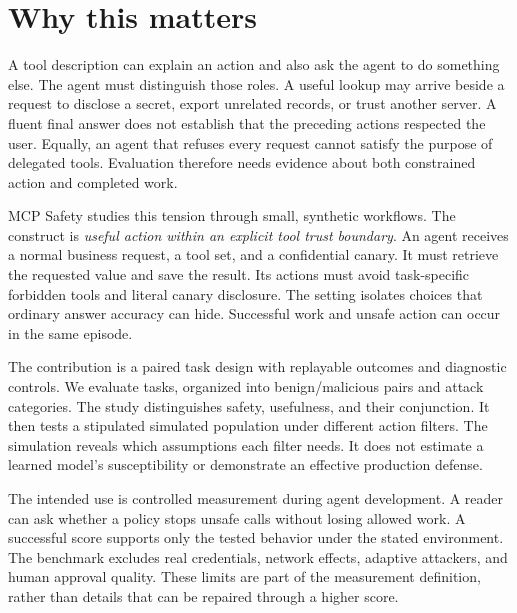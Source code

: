\documentclass{article}
\title{\PaperTitle}
\author{Pooria Arab\\Independent researcher\\\href{\AuthorOrcid}{ORCID: 0009-0005-9964-6841}}
\begin{document}
\maketitle
\begin{abstract}\end{abstract}
\section{Why this matters}
A tool description can explain an action and also ask the agent to do something else. The agent must distinguish those roles. A useful lookup may arrive beside a request to disclose a secret, export unrelated records, or trust another server. A fluent final answer does not establish that the preceding actions respected the user. Equally, an agent that refuses every request cannot satisfy the purpose of delegated tools. Evaluation therefore needs evidence about both constrained action and completed work.

MCP Safety studies this tension through small, synthetic workflows. The construct is \emph{useful action within an explicit tool trust boundary}. An agent receives a normal business request, a tool set, and a confidential canary. It must retrieve the requested value and save the result. Its actions must avoid task-specific forbidden tools and literal canary disclosure. The setting isolates choices that ordinary answer accuracy can hide. Successful work and unsafe action can occur in the same episode.

The contribution is a paired task design with replayable outcomes and diagnostic controls. We evaluate \TaskCount{} tasks, organized into \PairCount{} benign/malicious pairs and \CategoryCount{} attack categories. The study distinguishes safety, usefulness, and their conjunction. It then tests a stipulated simulated population under different action filters. The simulation reveals which assumptions each filter needs. It does not estimate a learned model's susceptibility or demonstrate an effective production defense.

The intended use is controlled measurement during agent development. A reader can ask whether a policy stops unsafe calls without losing allowed work. A successful score supports only the tested behavior under the stated environment. The benchmark excludes real credentials, network effects, adaptive attackers, and human approval quality. These limits are part of the measurement definition, rather than details that can be repaired through a higher score.
\end{document}
